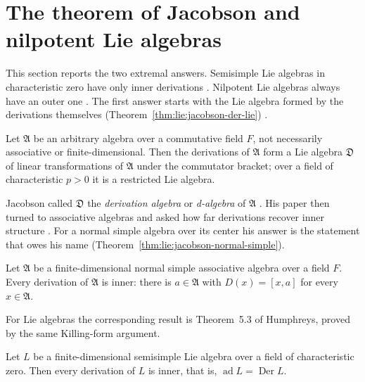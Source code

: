 \section{The theorem of Jacobson and nilpotent Lie algebras}\label{sec:lie-algebras:jacobson}

This section reports the two extremal answers.  Semisimple Lie algebras
in characteristic zero have only inner derivations
\cite[Theorem in \S 5.3, p.~23]{Humphreys1972}.  Nilpotent Lie algebras
always have an outer one \cite[Exercise~10, p.~14]{Humphreys1972}.  The
first answer starts with the Lie algebra formed by the derivations
themselves (Theorem~\ref{thm:lie:jacobson-der-lie}) \cite[Theorem~1, p.~206]{Jacobson1937}.

\begin{theorem}\label{thm:lie:jacobson-der-lie}
Let $\mathfrak{A}$ be an arbitrary algebra over a commutative field $F$,
not necessarily associative or finite-dimensional.  Then the derivations of
$\mathfrak{A}$ form a Lie algebra $\mathfrak{D}$ of linear transformations
of $\mathfrak{A}$ under the commutator bracket; over a field of
characteristic $p>0$ it is a restricted Lie algebra.
\end{theorem}

Jacobson called $\mathfrak{D}$ the \emph{derivation algebra} or
\emph{d-algebra} of $\mathfrak{A}$ \cite[p.~207]{Jacobson1937}.  His paper
then turned to associative algebras and asked how far derivations recover
inner structure \cite[pp.~209--215]{Jacobson1937}.  For a normal simple
algebra over its center his answer is the statement that owes his name (Theorem~\ref{thm:lie:jacobson-normal-simple}).

\begin{theorem}\label{thm:lie:jacobson-normal-simple}
Let $\mathfrak{A}$ be a finite-dimensional normal simple associative algebra
over a field $F$.  Every derivation of $\mathfrak{A}$ is inner: there is
$a\in\mathfrak{A}$ with $D(x)=[x,a]$ for every $x\in\mathfrak{A}$.
\end{theorem}

For Lie algebras the corresponding result is Theorem~5.3 of Humphreys,
proved by the same Killing-form argument.

\begin{theorem}\label{thm:lie:jacobson-humphreys}
Let $L$ be a finite-dimensional semisimple Lie algebra over a field of
characteristic zero.  Then every derivation of $L$ is inner, that is,
$\operatorname{ad} L=\operatorname{Der} L$.
\end{theorem}

